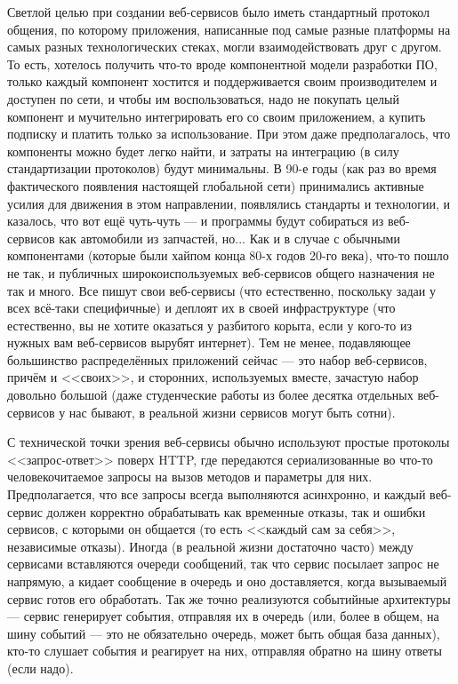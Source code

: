 \documentclass{../../text-style}
\begin{document}
Светлой целью при создании веб-сервисов было иметь стандартный протокол общения, по которому приложения, написанные под самые разные платформы на самых разных технологических стеках, могли взаимодействовать друг с другом. То есть, хотелось получить что-то вроде компонентной модели разработки ПО, только каждый компонент хостится и поддерживается своим производителем и доступен по сети, и чтобы им воспользоваться, надо не покупать целый компонент и мучительно интегрировать его со своим приложением, а купить подписку и платить только за использование. При этом даже предполагалось, что компоненты можно будет легко найти, и затраты на интеграцию (в силу стандартизации протоколов) будут минимальны. В 90-е годы (как раз во время фактического появления настоящей глобальной сети) принимались активные усилия для движения в этом направлении, появлялись стандарты и технологии, и казалось, что вот ещё чуть-чуть --- и программы будут собираться из веб-сервисов как автомобили из запчастей, но... Как и в случае с обычными компонентами (которые были хайпом конца 80-х годов 20-го века), что-то пошло не так, и публичных широкоиспользуемых веб-сервисов общего назначения не так и много. Все пишут свои веб-сервисы (что естественно, поскольку задаи у всех всё-таки специфичные) и деплоят их в своей инфраструктуре (что естественно, вы не хотите оказаться у разбитого корыта, если у кого-то из нужных вам веб-сервисов вырубят интернет). Тем не менее, подавляющее большинство распределённых приложений сейчас --- это набор веб-сервисов, причём и <<своих>>, и сторонних, используемых вместе, зачастую набор довольно большой (даже студенческие работы из более десятка отдельных веб-сервисов у нас бывают, в реальной жизни сервисов могут быть сотни).

С технической точки зрения веб-сервисы обычно используют простые протоколы <<запрос-ответ>> поверх HTTP, где передаются сериализованные во что-то человекочитаемое запросы на вызов методов и параметры для них. Предполагается, что все запросы всегда выполняются асинхронно, и каждый веб-сервис должен корректно обрабатывать как временные отказы, так и ошибки сервисов, с которыми он общается (то есть <<каждый сам за себя>>, независимые отказы). Иногда (в реальной жизни достаточно часто) между сервисами вставляются очереди сообщений, так что сервис посылает запрос не напрямую, а кидает сообщение в очередь и оно доставляется, когда вызываемый сервис готов его обработать. Так же точно реализуются событийные архитектуры --- сервис генерирует события, отправляя их в очередь (или, более в общем, на шину событий --- это не обязательно очередь, может быть общая база данных), кто-то слушает события и реагирует на них, отправляя обратно на шину ответы (если надо).
\end{document}
